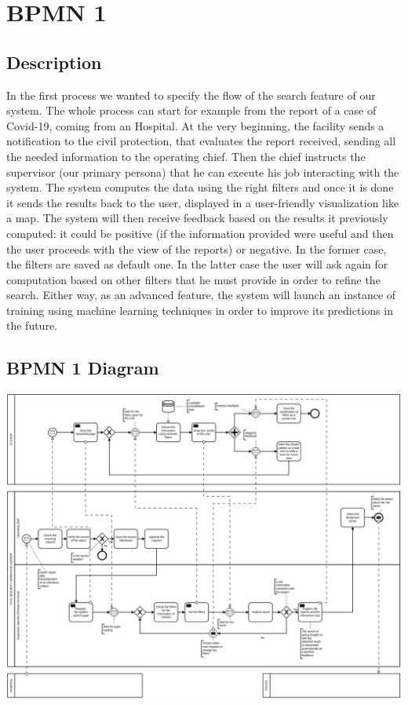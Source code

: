 \documentclass[../main.tex]{subfiles}
\begin{document}
    \chapter{BPMN 1}\label{ch:bpmn-1}
    \section{Description}\label{sec:description2}
    In the first process we wanted to specify the flow of the search feature of our system. The whole process can start for example from the report of a case of Covid-19, coming from an Hospital. At the very beginning, the facility sends a notification to the civil protection, that evaluates the report received, sending all the needed information to the operating chief. Then the chief instructs the supervisor (our primary persona) that he can execute his job interacting with the system. The system computes the data using the right filters and once it is done it sends the results back to the user, displayed in a user-friendly visualization like a map. The system will then receive feedback based on the results it previously computed: it could be positive (if the information provided were useful and then the user proceeds with the view of the reports) or negative. In the former case, the filters are saved as default one. In the latter case the user will ask again for computation based on other filters that he must provide in order to refine the search.
    Either way, as an advanced feature, the system will launch an instance of training using machine learning techniques in order to improve its predictions in the future.
    \section{BPMN 1 Diagram}\label{sec:bpmn-1-diagram}
    \includegraphics[scale = 0.4]{assets/bpmn1.png}
\end{document}
